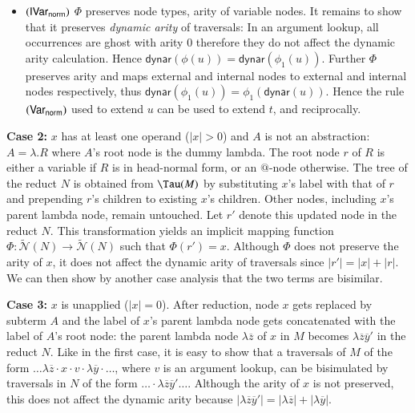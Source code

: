 \documentclass{elsarticle}
\theoremstyle{plain}
\theoremstyle{definition}
\newcommand\Nodes{\mathcal{N}}%
\newcommand\ExtendedNodes{\tilde{\Nodes}}
\newcommand{\normalizing}{{\sf norm}}
\newcommand{\ctree}{\Tau} %
\newcommand\dynar{\textsf{dynar}} %
\begin{document}
\begin{itemize}[itemindent=0.5em, leftmargin=0.5em]
    \item $\rulename{IVar_\normalizing}$ $\Phi$ preserves node types, arity of variable nodes. It remains to show that it preserves \emph{dynamic arity} of traversals: In an argument lookup, all occurrences are ghost with arity $0$ therefore they do not affect the dynamic arity calculation. Hence $\dynar(\phi(u))=\dynar(\phi_1(u))$. Further $\Phi$ preserves arity and maps external and internal nodes to external and internal nodes respectively, thus $\dynar(\phi_1(u))=\phi_1(\dynar(u))$.
    Hence the rule $\rulename{Var_\normalizing}$ used to extend $u$ can be used to extend $t$, and reciprocally.

\end{itemize}

{\bf Case 2:} $x$ has at least one operand ($|x|>0$) and $A$ is not an abstraction: $A = \lambda. R$ where $A$'s root node is the dummy lambda.
The root node $r$ of $R$ is either a variable if $R$ is in head-normal form, or an $@$-node otherwise.
The tree of the reduct $N$ is obtained from $\ctree(M)$
by substituting $x$'s label with that of $r$ and prepending $r$'s children to existing $x$'s children. Other nodes, including $x$'s parent lambda node, remain untouched. Let $r'$ denote this updated node in the reduct $N$.
This transformation yields an implicit mapping function $\Phi : \ExtendedNodes(N)\rightarrow \ExtendedNodes(N)$ such that $\Phi(r') = x$.
Although $\Phi$ does not preserve the arity of $x$, it does not affect the dynamic arity of traversals since $|r'| = |x| + |r|$.
We can then show by another case analysis that the two terms are bisimilar.

{\bf Case 3:} $x$ is unapplied ($|x|=0$).
%
After reduction, node $x$ gets replaced by subterm $A$ and the label of $x$'s parent lambda node gets concatenated with the label of $A$'s root node:
the parent lambda node $\lambda\overline{z}$ of $x$ in $M$ becomes $\lambda\overline{z}\overline{y}'$ in the reduct $N$.
Like in the first case, it is easy to show that a traversals of $M$ of the form $\ldots \lambda\overline{z}\cdot x \cdot v \cdot \lambda\overline{y} \cdot \ldots$, where $v$ is an argument lookup, can be bisimulated by traversals in $N$ of the form $\ldots \cdot \lambda\overline{z}\overline{y}' \ldots$. Although the arity of $x$ is not preserved, this does not affect the dynamic arity because $|\lambda{\overline{z} \overline{y}'}| =
 |\lambda{\overline{z}}| +  |\lambda{\overline{y}}|$.
\end{document}
